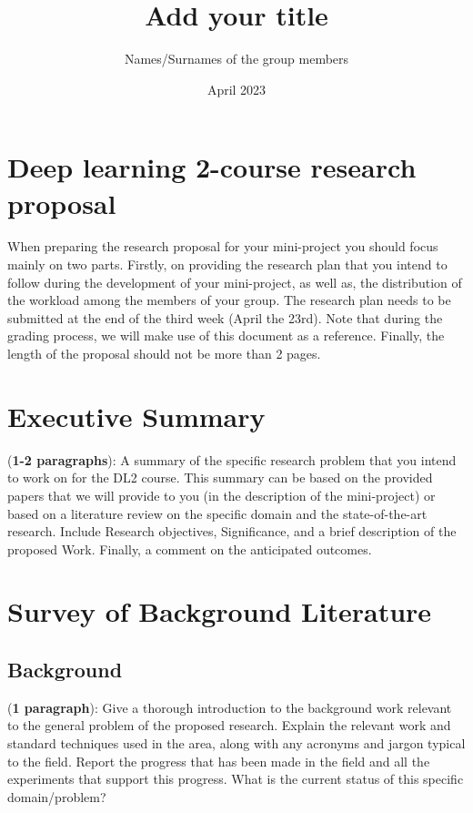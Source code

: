 \documentclass{article}
\title{Add your title }
\author{Names/Surnames of the group members }
\date{April 2023}
\begin{document}
\maketitle

\section*{Deep learning 2-course research proposal}


When preparing the research proposal for your mini-project you should focus mainly on two parts. Firstly, on providing the research plan that you intend to follow during the development of your mini-project, as well as, the distribution of the workload among the members of your group. The research plan needs to be submitted at the end of the third week (April the 23rd). Note that during the grading process, we will make use of this document as a reference. Finally, the length of the proposal should not be more than 2 pages.


\section{Executive Summary}

(\textbf{1-2 paragraphs}): A summary of the specific research problem that you intend to work on for the DL2 course. This summary can be based on the provided papers that we will provide to you (in the description of the mini-project) or based on a literature review on the specific domain and the state-of-the-art research. Include Research objectives, Significance, and a brief description of the proposed Work. Finally, a comment on the anticipated outcomes.

\section{Survey of Background Literature}

\subsection{Background}
(\textbf{1 paragraph}): Give a thorough introduction to the background work relevant to the general problem of the proposed research. Explain the relevant work and standard techniques used in the area, along with any acronyms and jargon typical to the field. Report the progress that has been made in the field and all the experiments that support this progress. What is the current status of this specific domain/problem?
\end{document}
